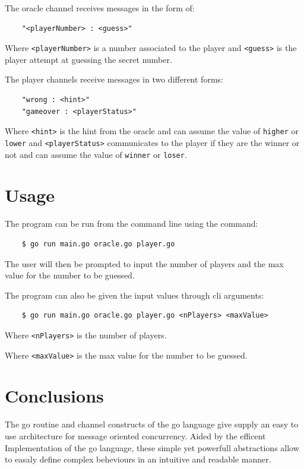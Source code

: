 \documentclass[12pt, a4paper]{report}
\begin{document}
The oracle channel receives messages in the form of:
\begin{lstlisting}
    "<playerNumber> : <guess>"
\end{lstlisting}
Where \verb|<playerNumber>| is a number associated to the player and \verb|<guess>| is the player attempt at guessing the secret number.

The player channels receive messages in two different forms:
\begin{lstlisting}
    "wrong : <hint>"
    "gameover : <playerStatus>"
\end{lstlisting}
Where \verb|<hint>| is the hint from the oracle and can assume the value of \verb|higher| or \verb|lower| 
 and \verb|<playerStatus>| communicates to the player if they are the winner or not and can assume the value of \verb|winner| or \verb|loser|.

\chapter{Usage}
The program can be run from the command line using the command:
\begin{lstlisting}
    $ go run main.go oracle.go player.go
\end{lstlisting}
The user will then be prompted to input the number of players and the max value for the number to be guessed.

The program can also be given the input values through cli arguments:
\begin{lstlisting}
    $ go run main.go oracle.go player.go <nPlayers> <maxValue>
\end{lstlisting}
Where \verb|<nPlayers>| is the number of players.

Where \verb|<maxValue>| is the max value for the number to be guessed.

\chapter{Conclusions}
The go routine and channel constructs of the go language give supply an easy to use architecture for message oriented concurrency. Aided by the efficent Implementation
 of the go language, these simple yet powerfull abstractions allow to easaly define complex beheviours in an intuitive and readable manner.



\end{document}

